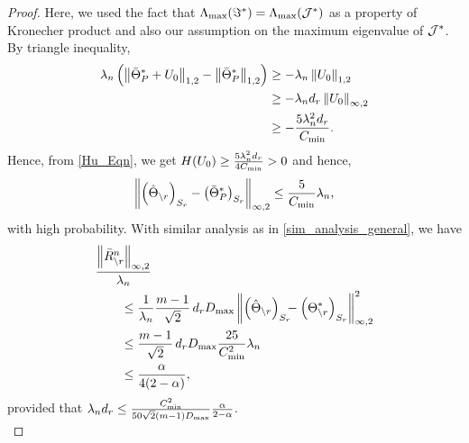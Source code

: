 \begin{proof}
Here, we used the fact that $\Lambda_{\max}(\Im^*)=\Lambda_{\max}(\mathcal{J}^*)$ as a property of Kronecher product and also our assumption on the maximum eigenvalue of $\mathcal{J}^*$. By triangle inequality,
\begin{equation}
\begin{aligned}
\lambda_n\left(\left\|\bar{\Theta}^*_P+U_0\right\|_{1,2} -\left\|\bar{\Theta}^*_P\right\|_{1,2}\right) &\geq -\lambda_n \left\|U_0\right\|_{1,2}\\
&\geq -\lambda_n d_{r} \left\|U_0\right\|_{\infty,2}\\
&\geq -\frac{5\lambda_n^2d_{r}}{C_{\min}}.
\end{aligned}
\nonumber
\end{equation}
Hence, from \eqref{Hu_Eqn}, we get $H(U_0)\geq\frac{5\lambda_n^2d_{r}}{4C_{\min}}>0$ and hence,
\begin{equation}
\left\|\left(\hat{\Theta}_{\backslash r}\right)_{S_{r}} -\left(\bar{\Theta}^*_P\right)_{S_{r}}\right\|_{\infty,2}\leq \frac{5}{C_{\min}}\lambda_n,
\label{err_bound_general}
\end{equation}
with high probability. With similar analysis as in \ref{sim_analysis_general}, we have
\begin{equation}
\begin{aligned}
&\frac{\left\|\bar{R}^n_{\backslash r}\right\|_{\infty,2}}{\lambda_n}\\ &\qquad\leq \frac{1}{\lambda_n}\frac{m-1}{\sqrt{2}}\,d_{r} D_{\max} \left\|\left(\hat{\Theta}_{\backslash r}\right)_{S_{r}} \!\!\!-\left(\Theta^*_{\backslash r}\right)_{S_{r}}\right\|_{\infty,2}^2\\
&\qquad\leq \frac{m-1}{\sqrt{2}} \,d_{r} D_{\max} \frac{25}{C_{\min}^2} \lambda_n\\
&\qquad\leq\frac{\alpha}{4(2-\alpha)},
\end{aligned}
\nonumber
\end{equation}
provided that $\lambda_nd_{r}\leq\frac{C_{\min}^2}{50\sqrt{2}(m-1)D_{\max}}\frac{\alpha}{2-\alpha}$.\\
\end{proof}
% 
% 
